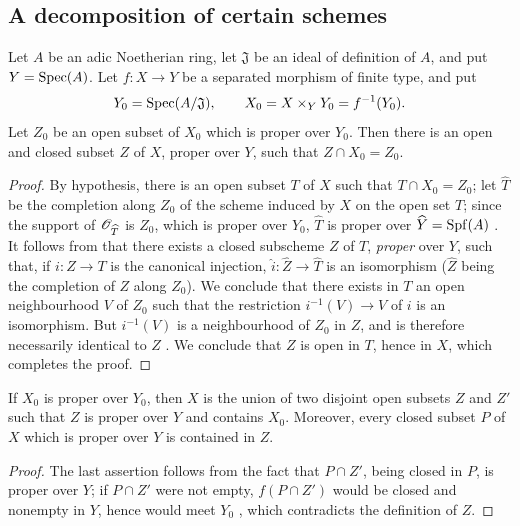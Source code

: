 \subsection{A decomposition of certain schemes}
\label{subsection:III.5.5}

\begin{proposition}[5.5.1]
\label{III.5.5.1}
Let $A$ be an adic Noetherian ring, let $\mathfrak{J}$ be an ideal
of definition of $A$, and put $Y=\operatorname{Spec}(A)$.  Let $f:X\to Y$ be a
separated morphism of finite type, and put
\[
  Y_0=\operatorname{Spec}(A/\mathfrak{J}),\qquad
  X_0=X\times_Y Y_0=f^{-1}(Y_0).
\]
Let $Z_0$ be an open subset of $X_0$ which is proper over $Y_0$.
Then there is an open and closed subset $Z$ of $X$, proper over
$Y$, such that $Z\cap X_0=Z_0$.
\end{proposition}

\begin{proof}
By hypothesis, there is an open subset $T$ of $X$ such that
$T\cap X_0=Z_0$; let $\widehat{T}$ be the completion along $Z_0$
of the scheme induced by $X$ on the open set $T$; since the support of
$\mathscr{O}_{\widehat{T}}$ is $Z_0$, which is proper over $Y_0$,
$\widehat{T}$ is proper over
$\widehat{Y}=\operatorname{Spf}(A)$ .  It follows from 
that there exists a closed subscheme $Z$ of $T$, \emph{proper} over $Y$,
such that, if $i:Z\to T$ is the canonical injection,
$\widehat{i}:\widehat{Z}\to\widehat{T}$ is an isomorphism
($\widehat{Z}$ being the completion of $Z$ along $Z_0$).  We conclude
 that there exists in $T$ an open neighbourhood $V$ of
$Z_0$ such that the restriction $i^{-1}(V)\to V$ of $i$ is an
isomorphism.  But $i^{-1}(V)$ is a neighbourhood of $Z_0$ in $Z$, and
is therefore necessarily identical to $Z$ .  We
conclude that $Z$ is open in $T$, hence in $X$, which completes the
proof.
\end{proof}

\begin{corollary}[5.5.2]
\label{III.5.5.2}
If $X_0$ is proper over $Y_0$, then $X$ is the union of two
disjoint open subsets $Z$ and $Z'$ such that $Z$ is proper over
$Y$ and contains $X_0$.  Moreover, every closed subset $P$ of $X$
which is proper over $Y$ is contained in $Z$.
\end{corollary}

\begin{proof}
The last assertion follows from the fact that $P\cap Z'$, being closed
in $P$, is proper over $Y$; if $P\cap Z'$ were not empty, $f(P\cap Z')$
would be closed and nonempty in $Y$, hence would meet $Y_0$
, which contradicts the definition of $Z$.
\end{proof}

